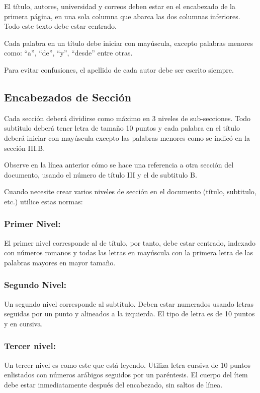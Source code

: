 El título, autores, universidad y correos deben estar en el encabezado de la primera
página, en una sola columna que abarca las dos columnas inferiores. Todo este texto
debe estar centrado.

Cada palabra en un título debe iniciar con mayúscula, excepto palabras menores
como: “a”, “de”, “y”, “desde” entre otras.

Para evitar confusiones, el apellido de cada autor debe ser escrito siempre.

\subsection{Encabezados de Sección}
Cada sección deberá dividirse como máximo en 3 niveles de sub-secciones. Todo
subtitulo deberá tener letra de tamaño 10 puntos y cada palabra en el título
deberá iniciar con mayúscula excepto las palabras menores como se indicó en la
sección III.B.

Observe en la línea anterior cómo se hace una referencia a otra sección del
documento, usando el número de título III y el de subtitulo B.

Cuando necesite crear varios niveles de sección en el documento (título, subtitulo,
etc.) utilice estas normas:

\subsubsection{Primer Nivel:\;}
El primer nivel corresponde al de título, por tanto, debe estar centrado, indexado
con números romanos y todas las letras en mayúscula con la primera letra de las palabras
mayores en mayor tamaño.

\subsubsection{Segundo Nivel:\;}
Un segundo nivel corresponde al subtítulo. Deben estar numerados usando letras
seguidas por un punto y alineados a la izquierda. El tipo de letra es de 10 puntos
y en cursiva.

\subsubsection{Tercer nivel:\;}
Un tercer nivel es como este que está leyendo. Utiliza letra cursiva de 10
puntos enlistados con números arábigos seguidos por un paréntesis. El cuerpo del
ítem debe estar inmediatamente después del encabezado, sin saltos de línea.

